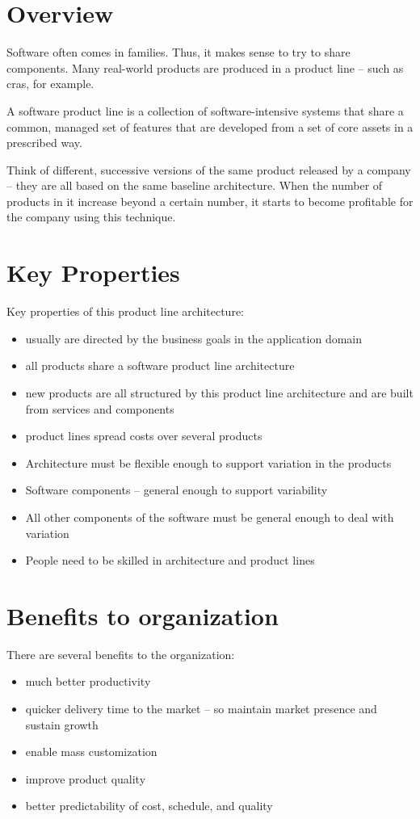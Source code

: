 \documentclass{report}
\begin{document}
\section{Overview}
Software often comes in families. Thus, it makes sense to try to share components. Many real-world products are produced in a product line – such as cras, for example.

A software product line is a collection of software-intensive systems that share a common, managed set of features that are developed from a set of core assets in a prescribed way. 

Think of different, successive versions of the same product released by a company – they are all based on the same baseline architecture. When the number of products in it increase beyond a certain number, it starts to become profitable for the company using this technique.

\section{Key Properties}
Key properties of this product line architecture:
\begin{itemize}
\item usually are directed by the business goals in the application domain
\item all products share a software product line architecture
\item new products are all structured by this product line architecture and are built from services and components
\item product lines spread costs over several products
\item Architecture must be flexible enough to support variation in the products
\item Software components – general enough to support variability
\item All other components of the software must be general enough to deal with variation
\item People need to be skilled in architecture and product lines
\end{itemize}

\section{Benefits to organization}
There are several benefits to the organization:
\begin{itemize}
\item much better productivity
\item quicker delivery time to the market – so maintain market presence and sustain growth
\item enable mass customization
\item improve product quality
\item better predictability of cost, schedule, and quality
\end{itemize}
\end{document}
